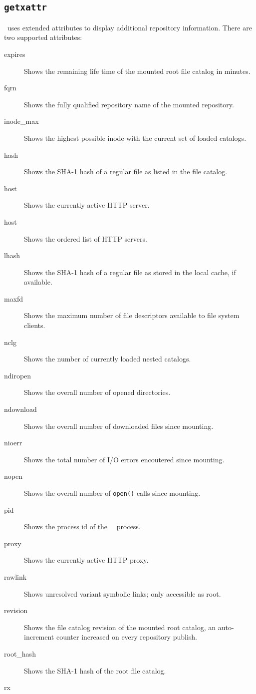\subsection{\tt getxattr}
\cvmfs\ uses extended attributes to display additional repository information.
There are two supported attributes:
\begin{description}
	\item[expires]
		Shows the remaining life time of the mounted root file catalog in minutes.
	\item[fqrn]
		Shows the fully qualified repository name of the mounted repository.
	\item[inode\_max]
		Shows the highest possible inode with the current set of loaded catalogs.		
	\item[hash]
		Shows the SHA-1 hash of a regular file as listed in the file catalog.
	\item[host]
		Shows the currently active HTTP server.
	\item[host]
		Shows the ordered list of HTTP servers.
	\item[lhash]
		Shows the SHA-1 hash of a regular file as stored in the local cache, if available.
	\item[maxfd]
		Shows the maximum number of file descriptors available to file system clients.
	\item[nclg]
		Shows the number of currently loaded nested catalogs.
	\item[ndiropen]
		Shows the overall number of opened directories.
	\item[ndownload]
		Shows the overall number of downloaded files since mounting.
	\item[nioerr]
		Shows the total number of I/O errors encoutered since mounting.			
	\item[nopen]
		Shows the overall number of \texttt{open()} calls since mounting.
	\item[pid]
		Shows the process id of the \cvmfs\ \fuse\ process.		
	\item[proxy]
		Shows the currently active HTTP proxy.
	\item[rawlink]
	    Shows unresolved variant symbolic links; only accessible as root.
	\item[revision]
		Shows the file catalog revision of the mounted root catalog, an auto-increment counter increased on every repository publish.
	\item[root\_hash]
		Shows the SHA-1 hash of the root file catalog.
	\item[rx]

\end{description}
